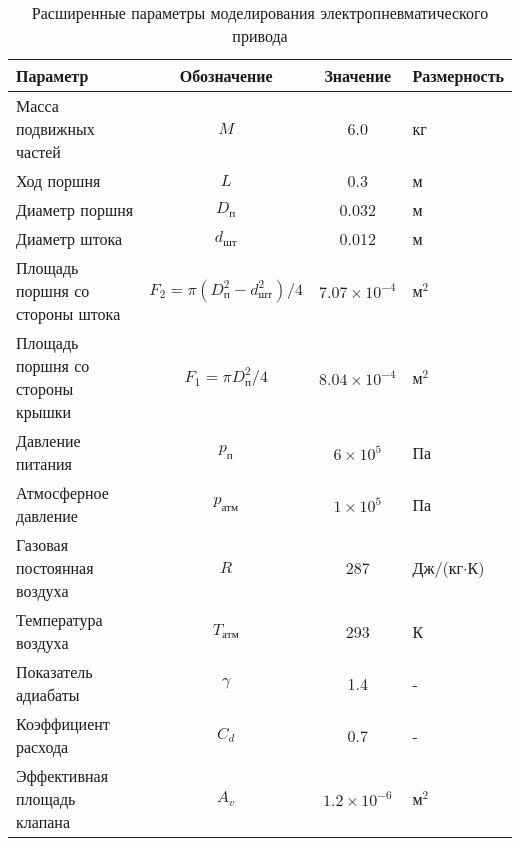 \begin{table}[h]
    \centering
    \caption{Расширенные параметры моделирования электропневматического привода}
    \small
    \begin{tabular}{lccl}
        \textbf{Параметр}                & \textbf{Обозначение}                      & \textbf{Значение}     & \textbf{Размерность} \\
        \midrule
        Масса подвижных частей           & $M$                                       & 6.0                   & кг                   \\
        Ход поршня                       & $L$                                       & 0.3                   & м                    \\
        Диаметр поршня                   & $D_\text{п}$                              & 0.032                 & м                    \\
        Диаметр штока                    & $d_\text{шт}$                             & 0.012                 & м                    \\
        Площадь поршня со стороны штока  & $F_2 = \pi(D_\text{п}^2-d_\text{шт}^2)/4$ & $7.07 \times 10^{-4}$ & м$^2$                \\
        Площадь поршня со стороны крышки & $F_1 = \pi D_\text{п}^2/4$                & $8.04 \times 10^{-4}$ & м$^2$                \\
        Давление питания                 & $p_\text{п}$                              & $6 \times 10^5$       & Па                   \\
        Атмосферное давление             & $p_\text{атм}$                            & $1 \times 10^5$       & Па                   \\
        Газовая постоянная воздуха       & $R$                                       & 287                   & Дж/(кг$\cdot$К)      \\
        Температура воздуха              & $T_\text{атм}$                            & 293                   & К                    \\
        Показатель адиабаты              & $\gamma$                                  & 1.4                   & -                    \\
        Коэффициент расхода              & $C_d$                                     & 0.7                   & -                    \\
        Эффективная площадь клапана      & $A_v$                                     & $1.2 \times 10^{-6}$  & м$^2$                \\

\end{tabular}
\end{table}
